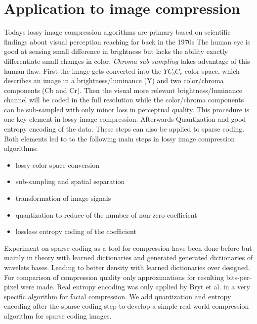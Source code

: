 \section{Application to image compression}
\label{sec:compression}
Todays lossy image compression algorithms are primary based on scientific
findings about visual perception reaching far back in the 1970s\cite{?}
The human eye is good at sensing small difference in brightness but lacks the
ability exactly differentiate small changes in color. \emph{Chroma sub-sampling}
takes advantage of this human flaw. First the image gets converted into the
$YC_bC_r$ color space, which describes an image in a brightness/luminance (Y)
and two color/chroma components (Cb and Cr). Then the visual more relevant
brightness/luminance channel will be coded in the full resolution while the
color/chroma components can be sub-sampled with only minor loss in perceptual
quality. This procedure
is one key element in lossy image compression. 
Afterwards 
Quantization and good entropy encoding of the data.
These steps can also be applied to sparse coding. Both elements
led to to the following main steps in lossy image compression algorithms:
\begin{itemize}
 \item lossy color space conversion
 \item sub-sampling and spatial separation
 \item transformation of image signals
 \item quantization to reduce of the number of non-zero coefficient 
 \item lossless entropy coding of the coefficient 
\end{itemize}

Experiment on sparse coding as a tool for compression have been done
before\cite{Lewicki1999,Murray2006} but mainly in theory with learned
dictionaries and generated generated dictionaries of wavelets bases. Leading to
better density with learned dictionaries over designed. For comparison of
compression quality only approximations for resulting bits-per-pixel were
made. Real entropy encoding was only applied by Bryt et al.\cite{Bryt2008} in
a very specific algorithm for facial compression. We add quantization and
entropy encoding after the sparse coding step to develop a simple real world
compression algorithm for sparse coding images.

